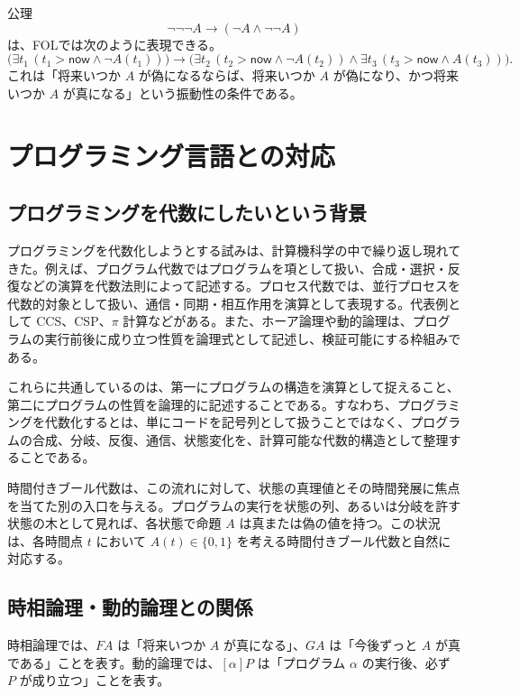 \documentclass[10pt]{ltjsarticle}
\begin{document}
公理
\[
  \neg\neg\neg A \to (\neg A \land \neg\neg A)
\]
は、FOLでは次のように表現できる。
\[
  \bigl(\exists t_1\,(t_1 > \mathsf{now} \land \neg A(t_1))\bigr)
  \to
  \bigl(
    \exists t_2\,(t_2 > \mathsf{now} \land \neg A(t_2))
    \land
    \exists t_3\,(t_3 > \mathsf{now} \land A(t_3))
  \bigr).
\]
これは「将来いつか $A$ が偽になるならば、将来いつか $A$ が偽になり、かつ将来いつか $A$ が真になる」という振動性の条件である。

\section{プログラミング言語との対応}

\subsection{プログラミングを代数にしたいという背景}

プログラミングを代数化しようとする試みは、計算機科学の中で繰り返し現れてきた。例えば、プログラム代数ではプログラムを項として扱い、合成・選択・反復などの演算を代数法則によって記述する。プロセス代数では、並行プロセスを代数的対象として扱い、通信・同期・相互作用を演算として表現する。代表例として CCS、CSP、$\pi$ 計算などがある。また、ホーア論理や動的論理は、プログラムの実行前後に成り立つ性質を論理式として記述し、検証可能にする枠組みである。

これらに共通しているのは、第一にプログラムの構造を演算として捉えること、第二にプログラムの性質を論理的に記述することである。すなわち、プログラミングを代数化するとは、単にコードを記号列として扱うことではなく、プログラムの合成、分岐、反復、通信、状態変化を、計算可能な代数的構造として整理することである。

時間付きブール代数は、この流れに対して、状態の真理値とその時間発展に焦点を当てた別の入口を与える。プログラムの実行を状態の列、あるいは分岐を許す状態の木として見れば、各状態で命題 $A$ は真または偽の値を持つ。この状況は、各時間点 $t$ において $A(t) \in \{0,1\}$ を考える時間付きブール代数と自然に対応する。

\subsection{時相論理・動的論理との関係}

時相論理では、$F A$ は「将来いつか $A$ が真になる」、$G A$ は「今後ずっと $A$ が真である」ことを表す。動的論理では、$[\alpha]P$ は「プログラム $\alpha$ の実行後、必ず $P$ が成り立つ」ことを表す。
\end{document}
